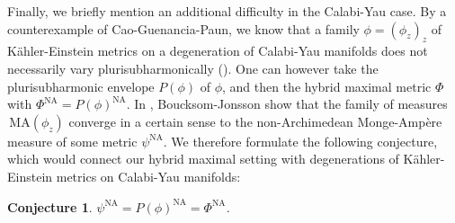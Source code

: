 \documentclass[JEP,XML,SOM,Unicode,NoEqCountersInSection,published]{cedram}
\newtheorem{conjecture}[theorem]{Conjecture}
\theoremstyle{definition}
\newcommand\MA{\,\mathrm{MA}}
\newcommand\na{^{\mathrm{NA}}}
\begin{document}
Finally, we briefly mention an additional difficulty in the Calabi-Yau case. By a counterexample of Cao-Guenancia-Paun, we know that a family $\phi=(\phi_z)_z$ of Kähler-Einstein metrics on a degeneration of Calabi-Yau manifolds does not necessarily vary plurisubharmonically (\cite[Th.\,3.1]{cgp2}). One can however take the plurisubharmonic envelope $P(\phi)$ of $\phi$, and then the hybrid maximal metric $\Phi$ with $\Phi\na=P(\phi)\na$. In \cite{bjtrop}, Boucksom-Jonsson show that the family of measures $\MA(\phi_z)$ converge in a certain sense to the non-Archimedean Monge-Ampère measure of some metric $\psi\na$. We therefore formulate the following conjecture, which would connect our hybrid maximal setting with degenerations of Kähler-Einstein metrics on Calabi-Yau manifolds:
\begin{conjecture}
$\psi\na=P(\phi)\na=\Phi\na$.
\end{conjecture}

\newpage
\backmatter


\end{document}
